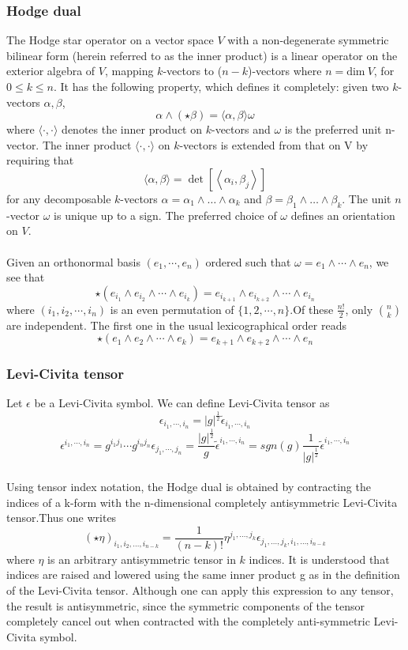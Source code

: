 \documentclass{article}
\begin{document}
\subsubsection{Hodge dual}
The Hodge star operator on a vector space $V$ with a non-degenerate symmetric bilinear form (herein referred to as the inner product) is a linear operator on the exterior algebra of $V$, mapping $k$-vectors to ($n-k$)-vectors where $n = \text{dim} \ V$, for $ 0 \leq k \leq n$. It has the following property, which defines it completely: given two $k$-vectors $\alpha,\beta$,
\[\alpha \wedge (\star \beta )=\langle \alpha ,\beta \rangle \omega\]
where $\langle \cdot ,\cdot \rangle$ denotes the inner product on $k$-vectors and $\omega$ is the preferred unit n-vector.
The inner product $\langle \cdot ,\cdot \rangle$ on $k$-vectors is extended from that on V by requiring that
\[\langle \alpha ,\beta \rangle =\det \left[\left\langle \alpha _{i},\beta _{j}\right\rangle \right]\]
for any decomposable $k$-vectors $\alpha =\alpha _{1}\wedge \dots \wedge \alpha _{k}$ and $\beta =\beta _{1}\wedge \dots \wedge \beta _{k}$. The unit $n$-vector $\omega$ is unique up to a sign. The preferred choice of $\omega$ defines an orientation on $V$.\\ \\
Given an orthonormal basis $(e_{1},\cdots ,e_{n})$ ordered such that $\omega =e_{1}\wedge \cdots \wedge e_{n}$, we see that
\[\star (e_{i_{1}}\wedge e_{i_{2}}\wedge \cdots \wedge e_{i_{k}})=e_{i_{k+1}}\wedge e_{i_{k+2}}\wedge \cdots \wedge e_{i_{n}}\]
where $(i_{1},i_{2},\cdots ,i_{n})$ is an even permutation of $\{1,2,\cdots,n\}$.Of these $\frac{n!}{2}$, only $n \choose k$ are independent. The first one in the usual lexicographical order reads
\[\star (e_{1}\wedge e_{2}\wedge \cdots \wedge e_{k})=e_{k+1}\wedge e_{k+2}\wedge \cdots \wedge e_{n}\]

\subsubsection{Levi-Civita tensor}
Let $\epsilon$ be a Levi-Civita symbol. We can define Levi-Civita tensor as 
\[\epsilon_{i_1,\cdots,i_n} = |g|^{\frac{1}{2}} \tilde{\epsilon}_{i_1,\cdots,i_n}\]
\[\epsilon^{i_1,\cdots,i_n} = g^{i_1j_1} \cdots g^{i_nj_n} \epsilon_{j_1,\cdots,j_n} = \frac{|g|^{\frac{1}{2}}}{g} \tilde{\epsilon}^{i_1,\cdots,i_n} = sgn(g) \frac{1}{|g|^{\frac{1}{2}}} \tilde{\epsilon}^{i_1,\cdots,i_n}\]\\
Using tensor index notation, the Hodge dual is obtained by contracting the indices of a k-form with the n-dimensional completely antisymmetric Levi-Civita tensor.Thus one writes
\[(\star \eta )_{i_{1},i_{2},\ldots ,i_{n-k}}={\frac {1}{(n-k)!}}\eta ^{j_{1},\ldots ,j_{k}} \epsilon _{j_{1},\ldots ,j_{k},i_{1},\ldots ,i_{n-k}}\]
where $\eta$ is an arbitrary antisymmetric tensor in $k$ indices. It is understood that indices are raised and lowered using the same inner product g as in the definition of the Levi-Civita tensor. Although one can apply this expression to any tensor, the result is antisymmetric, since the symmetric components of the tensor completely cancel out when contracted with the completely anti-symmetric Levi-Civita symbol.
\end{document}
